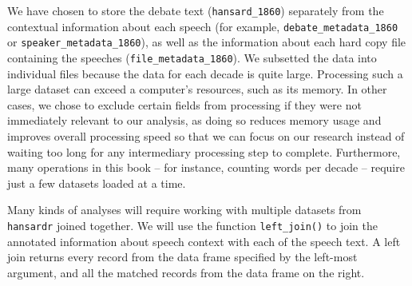 \documentclass[
]{article}
\begin{document}
\begin{table}
\centering
\caption{\label{tab:unnamed-chunk-9}Source-file metadata for selected sentences from the 1860 Hansard corpus, 
    including the identifiers for the sentence, speech, and debate, as well as the source 
    file, source image, and original column location.}
\centering
{}
\end{table}

We have chosen to store the debate text (\texttt{hansard\_1860})
separately from the contextual information about each speech (for
example, \texttt{debate\_metadata\_1860} or
\texttt{speaker\_metadata\_1860}), as well as the information about each
hard copy file containing the speeches (\texttt{file\_metadata\_1860}).
We subsetted the data into individual files because the data for each
decade is quite large. Processing such a large dataset can exceed a
computer's resources, such as its memory. In other cases, we chose to
exclude certain fields from processing if they were not immediately
relevant to our analysis, as doing so reduces memory usage and improves
overall processing speed so that we can focus on our research instead of
waiting too long for any intermediary processing step to complete.
Furthermore, many operations in this book -- for instance, counting
words per decade -- require just a few datasets loaded at a time.

Many kinds of analyses will require working with multiple datasets from
\texttt{hansardr} joined together. We will use the function
\texttt{left\_join()} to join the annotated information about speech
context with each of the speech text. A left join returns every record
from the data frame specified by the left-most argument, and all the
matched records from the data frame on the right.
\end{document}
